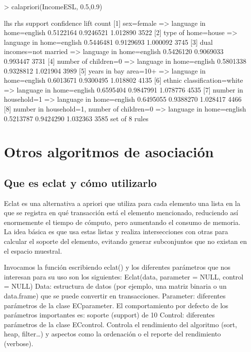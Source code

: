 \documentclass [a4paper] {article}
\begin{document}
\begin{Schunk}
\begin{Sinput}
> calapriori(IncomeESL, 0.5,0.9)
\end{Sinput}
\begin{Soutput}
    lhs                              rhs                          support confidence     lift count
[1] {sex=female}                  => {language in home=english} 0.5122164  0.9246521 1.012890  3522
[2] {type of home=house}          => {language in home=english} 0.5446481  0.9129693 1.000092  3745
[3] {dual incomes=not married}    => {language in home=english} 0.5426120  0.9069033 0.993447  3731
[4] {number of children=0}        => {language in home=english} 0.5801338  0.9328812 1.021904  3989
[5] {years in bay area=10+}       => {language in home=english} 0.6013671  0.9300495 1.018802  4135
[6] {ethnic classification=white} => {language in home=english} 0.6595404  0.9847991 1.078776  4535
[7] {number in household=1}       => {language in home=english} 0.6495055  0.9388270 1.028417  4466
[8] {number in household=1,                                                                        
     number of children=0}        => {language in home=english} 0.5213787  0.9424290 1.032363  3585
set of 8 rules 
\end{Soutput}
\end{Schunk}


\section{Otros algoritmos de asociación}

\subsection{Que es eclat y cómo utilizarlo}
Eclat es una alternativa a apriori que utiliza para cada elemento una lista en la que se registra en qué transacción está el 
elemento mencionado, reduciendo así enormemente el tiempo de cómputo, pero aumentando el consumo de memoria. La idea básica 
es que usa estas listas y realiza intersecciones con otras para calcular el soporte del elemento, evitando generar subconjuntos 
que no existan en el espacio muestral.

Invocamos la función escribiendo eclat() y los diferentes parámetros que nos interesan para su uso son los siguientes:
Eclat(data, parameter = NULL,  control = NULL)
Data: estructura de datos (por ejemplo, una matriz binaria o un data.frame) que se puede convertir en transacciones.
Parameter: diferentes parámetros de la clase ECparameter. El comportamiento por defecto de los parámetros importantes es: soporte (support) de 10%
Control: diferentes parámetros de la clase ECcontrol. Controla el rendimiento del algoritmo (sort, heap, filter…) y aspectos como la ordenación o el reporte del rendimiento (verbose).
\end{document}
